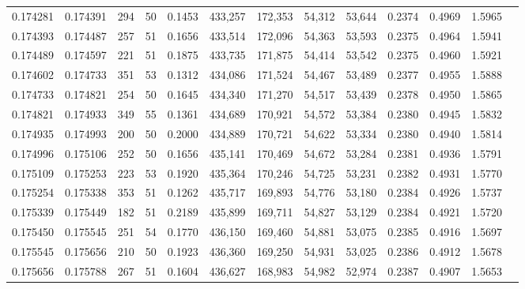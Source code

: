 \begin{tabular}{rrrrrrrrrrrrr}
0.174281 & 0.174391 &   294 &  50 &                                     0.1453 & 433,257 & 172,353 &  54,312 &  53,644 & 0.2374 & 0.4969 & 1.5965 \\
0.174393 & 0.174487 &   257 &  51 &                                     0.1656 & 433,514 & 172,096 &  54,363 &  53,593 & 0.2375 & 0.4964 & 1.5941 \\
0.174489 & 0.174597 &   221 &  51 &                                     0.1875 & 433,735 & 171,875 &  54,414 &  53,542 & 0.2375 & 0.4960 & 1.5921 \\
0.174602 & 0.174733 &   351 &  53 &                                     0.1312 & 434,086 & 171,524 &  54,467 &  53,489 & 0.2377 & 0.4955 & 1.5888 \\
0.174733 & 0.174821 &   254 &  50 &                                     0.1645 & 434,340 & 171,270 &  54,517 &  53,439 & 0.2378 & 0.4950 & 1.5865 \\
0.174821 & 0.174933 &   349 &  55 &                                     0.1361 & 434,689 & 170,921 &  54,572 &  53,384 & 0.2380 & 0.4945 & 1.5832 \\
0.174935 & 0.174993 &   200 &  50 &                                     0.2000 & 434,889 & 170,721 &  54,622 &  53,334 & 0.2380 & 0.4940 & 1.5814 \\
0.174996 & 0.175106 &   252 &  50 &                                     0.1656 & 435,141 & 170,469 &  54,672 &  53,284 & 0.2381 & 0.4936 & 1.5791 \\
0.175109 & 0.175253 &   223 &  53 &                                     0.1920 & 435,364 & 170,246 &  54,725 &  53,231 & 0.2382 & 0.4931 & 1.5770 \\
0.175254 & 0.175338 &   353 &  51 &                                     0.1262 & 435,717 & 169,893 &  54,776 &  53,180 & 0.2384 & 0.4926 & 1.5737 \\
0.175339 & 0.175449 &   182 &  51 &                                     0.2189 & 435,899 & 169,711 &  54,827 &  53,129 & 0.2384 & 0.4921 & 1.5720 \\
0.175450 & 0.175545 &   251 &  54 &                                     0.1770 & 436,150 & 169,460 &  54,881 &  53,075 & 0.2385 & 0.4916 & 1.5697 \\
0.175545 & 0.175656 &   210 &  50 &                                     0.1923 & 436,360 & 169,250 &  54,931 &  53,025 & 0.2386 & 0.4912 & 1.5678 \\
0.175656 & 0.175788 &   267 &  51 &                                     0.1604 & 436,627 & 168,983 &  54,982 &  52,974 & 0.2387 & 0.4907 & 1.5653 \\

\end{tabular}
